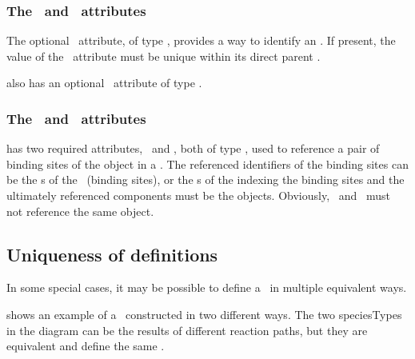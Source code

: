 \subsubsection{The \idAtt\ and \nameAtt\ attributes}
\label{def:InSpeciesTypeBond:idAndName}

The optional \idAtt\ attribute, of type \SIdPT, provides a way to identify an \inSpeciesTypeBond. If present, the value of the \idAtt\ attribute must be unique within its direct parent \speciesType.

 also has an optional \nameAtt\ attribute of type \stringPT. 

\subsubsection{The \bindingSiteOneAtt\ and \bindingSiteTwoAtt\ attributes}
\label{def:InSpeciesTypeBond:bindingSites}

 has two required attributes, \bindingSiteOneAtt\ and \bindingSiteTwoAtt, both of type \SIdRefPT, used to reference a pair of binding sites of the \InSpeciesTypeBond object in a \speciesType. The referenced identifiers of the binding sites can be the \idAtt s of the \speciesTypeInstances\ (binding sites), or the \idAtt s of the  indexing the binding sites  and the ultimately referenced components must be the \BindingSiteSpeciesType objects. Obviously, \bindingSiteOneAtt\ and \bindingSiteTwoAtt\ must not reference the same \BindingSiteSpeciesType object. 

\clearpage

\subsection{Uniqueness of  definitions}
\label{def:SpeciesType:Uniqueness}

In some special cases, it may be possible to define a \speciesType\ in multiple equivalent ways. 

 shows an example of a \speciesType\ constructed in two different ways. The two  speciesTypes in the diagram can be the results of different reaction paths, but they are equivalent and define the same \speciesType.

